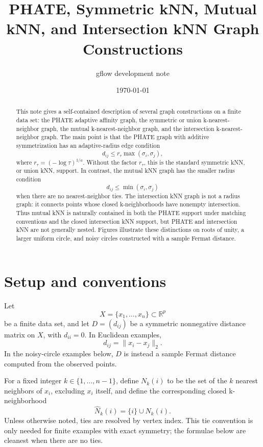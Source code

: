 \documentclass[11pt]{article}
\title{PHATE, Symmetric kNN, Mutual kNN, and Intersection kNN Graph Constructions}
\author{gflow development note}
\date{\today}
\newcommand{\R}{\mathbb{R}}
\begin{document}
\maketitle

\begin{abstract}
This note gives a self-contained description of several graph constructions on a finite data
set: the PHATE adaptive affinity graph, the symmetric or union k-nearest-neighbor graph, the
mutual k-nearest-neighbor graph, and the intersection k-nearest-neighbor graph.  The main
point is that the PHATE graph with additive symmetrization has an adaptive-radius edge condition
\[
  d_{ij} \le r_\tau \max(\sigma_i,\sigma_j),
\]
where \(r_\tau=(-\log \tau)^{1/a}\).  Without the factor \(r_\tau\), this is the standard
symmetric kNN, or union kNN, support.  In contrast, the mutual kNN graph has the smaller
radius condition
\[
  d_{ij}\le \min(\sigma_i,\sigma_j)
\]
when there are no nearest-neighbor ties.  The intersection kNN graph is not a radius graph:
it connects points whose closed k-neighborhoods have nonempty intersection.  Thus mutual kNN
is naturally contained in both the PHATE support under matching conventions and the closed
intersection kNN support, but PHATE and intersection kNN are not generally nested.  Figures
illustrate these distinctions on roots of unity, a larger uniform circle, and noisy circles
constructed with a sample Fermat distance.
\end{abstract}

\section{Setup and conventions}

Let
\[
  X=\{x_1,\ldots,x_n\}\subset \R^p
\]
be a finite data set, and let \(D=(d_{ij})\) be a symmetric nonnegative distance matrix on
\(X\), with \(d_{ii}=0\).  In Euclidean examples,
\[
  d_{ij}=\lVert x_i-x_j\rVert_2.
\]
In the noisy-circle examples below, \(D\) is instead a sample Fermat distance computed from
the observed points.

For a fixed integer \(k\in\{1,\ldots,n-1\}\), define \(N_k(i)\) to be the set of the \(k\)
nearest neighbors of \(x_i\), excluding \(x_i\) itself, and define the corresponding closed
k-neighborhood
\[
  \widehat{N}_k(i)=\{i\}\cup N_k(i).
\]
Unless otherwise noted, ties are resolved by vertex index.  This tie convention is only
needed for finite examples with exact symmetry; the formulae below are cleanest when there
are no ties.
\end{document}
